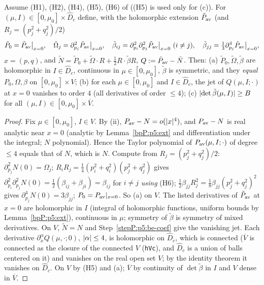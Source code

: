 \begin{lemma}\label{bpP:p5:birkhoff-ext}
Assume (H1), (H2), (H4), (H5), (H6) of  ((H5) is used only for (c)). For $(\mu,I)\in[0,\mu_0]\times\hat D_c$ define, with the holomorphic extension $\tilde P_{\rm av}$ (and $R_j=(p_j^2+q_j^2)/2$)
\[\tilde P_0=\tilde P_{\rm av}\big|_{x=0},\quad\tilde\Omega_j=\partial_{p_j}^2\tilde P_{\rm av}\big|_{x=0},\quad\tilde\beta_{ij}=\partial^2_{p_i}\partial^2_{p_j}\tilde P_{\rm av}\big|_{x=0}\ (i\ne j),\quad\tilde\beta_{jj}=\tfrac13\partial^4_{p_j}\tilde P_{\rm av}\big|_{x=0},\]
$x=(p,q)$, and $\tilde N=\tilde P_0+\tilde\Omega\cdot R+\frac12R\cdot\tilde\beta R$, $Q:=\tilde P_{\rm av}-\tilde N$. Then:
(a) $\tilde P_0,\tilde\Omega,\tilde\beta$ are holomorphic in $I\in\hat D_c$, continuous in $\mu\in[0,\mu_0]$, $\tilde\beta$ is symmetric, and they \emph{equal} $P_0,\Omega,\beta$ on $[0,\mu_0]\times V$;
(b) for each $\mu\in[0,\mu_0]$ and $I\in\hat D_c$, the jet of $Q(\mu,I;\cdot)$ at $x=0$ vanishes to order $4$ (all derivatives of order $\le4$);
(c) $\lvert \det\tilde\beta(\mu,I)\rvert\ge B$ for all $(\mu,I)\in[0,\mu_0]\times\overline V$.
\end{lemma}
\begin{proof}
\label{stepP:p5:be-coef} Fix $\mu\in[0,\mu_0]$, $I\in V$. By (ii), $P_{\rm av}-N=o(\lvert x\rvert^4)$, and $P_{\rm av}-N$ is real analytic near $x=0$ (analytic by Lemma~\ref{bpP:p5:ext} and differentiation under the integral; $N$ polynomial). Hence the Taylor polynomial of $P_{\rm av}(\mu,I;\cdot)$ of degree $\le4$ equals that of $N$, which is $N$. Compute from $R_j=(p_j^2+q_j^2)/2$: $\partial^2_{p_j}N(0)=\Omega_j$; $R_iR_j=\frac14(p_i^2+q_i^2)(p_j^2+q_j^2)$ gives $\partial^2_{p_i}\partial^2_{p_j}N(0)=\frac12(\beta_{ij}+\beta_{ji})=\beta_{ij}$ for $i\ne j$ \emph{using} (H6); $\frac12\beta_{jj}R_j^2=\frac18\beta_{jj}(p_j^2+q_j^2)^2$ gives $\partial^4_{p_j}N(0)=3\beta_{jj}$; $P_0=P_{\rm av}|_{x=0}$. So (a) on $V$.
\label{stepP:p5:be-an} The listed derivatives of $\tilde P_{\rm av}$ at $x=0$ are holomorphic in $I$ (integral of holomorphic functions, uniform bounds by Lemma~\ref{bpP:p5:ext}), continuous in $\mu$; symmetry of $\tilde\beta$ is symmetry of mixed derivatives.
\label{stepP:p5:be-jet} On $V$, $\tilde N=N$ and Step~\ref{stepP:p5:be-coef} give the vanishing jet. Each derivative $\partial_x^\alpha Q(\mu,\cdot;0)$, $\lvert \alpha\rvert\le4$, is holomorphic on $\hat D_c$, which is connected ($\overline V$ is connected as the closure of the connected $V$ (\texttt{hVc}), and $\hat D_c$ is a union of balls centered on it) and vanishes on the real open set $V$; by the identity theorem it vanishes on $\hat D_c$.
\label{stepP:p5:be-det} On $V$ by (H5) and (a); $\overline V$ by continuity of $\det\tilde\beta$ in $I$ and $V$ dense in $\overline V$.
\end{proof}

